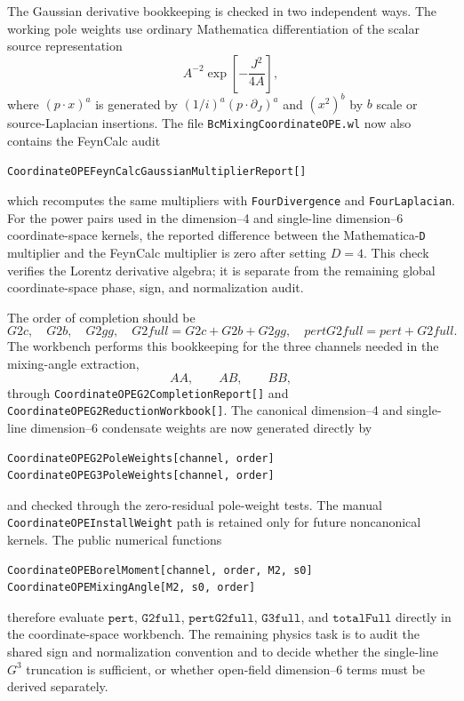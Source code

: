 \documentclass[11pt]{article}
\begin{document}
The Gaussian derivative bookkeeping is checked in two independent ways.  The
working pole weights use ordinary Mathematica differentiation of the scalar
source representation
\[
  A^{-2}\exp\!\left[-\frac{J^2}{4A}\right],
\]
where \((p\cdot x)^a\) is generated by \((1/i)^a(p\cdot\partial_J)^a\) and
\((x^2)^b\) by \(b\) scale or source-Laplacian insertions.  The file
\texttt{BcMixingCoordinateOPE.wl} now also contains the FeynCalc audit
\begin{verbatim}
CoordinateOPEFeynCalcGaussianMultiplierReport[]
\end{verbatim}
which recomputes the same multipliers with
\texttt{FourDivergence} and \texttt{FourLaplacian}.  For the power pairs used
in the dimension--4 and single-line dimension--6 coordinate-space kernels, the
reported difference between the Mathematica-\texttt{D} multiplier and the
FeynCalc multiplier is zero after setting \(D=4\).  This check verifies the
Lorentz derivative algebra; it is separate from the remaining global
coordinate-space phase, sign, and normalization audit.

The order of completion should be
\[
  G2c,\quad G2b,\quad G2gg,\quad
  G2full=G2c+G2b+G2gg,\quad
  pertG2full=pert+G2full .
\]
The workbench performs this bookkeeping for the three channels needed in the
mixing-angle extraction,
\[
  AA,\qquad AB,\qquad BB ,
\]
through \texttt{CoordinateOPEG2CompletionReport[]} and
\texttt{CoordinateOPEG2ReductionWorkbook[]}.  The canonical dimension--4 and
single-line dimension--6 condensate weights are now generated directly by
\begin{verbatim}
CoordinateOPEG2PoleWeights[channel, order]
CoordinateOPEG3PoleWeights[channel, order]
\end{verbatim}
and checked through the zero-residual pole-weight tests.  The manual
\texttt{CoordinateOPEInstallWeight} path is retained only for future
noncanonical kernels.  The public numerical functions
\begin{verbatim}
CoordinateOPEBorelMoment[channel, order, M2, s0]
CoordinateOPEMixingAngle[M2, s0, order]
\end{verbatim}
therefore evaluate \(\texttt{pert}\), \(\texttt{G2full}\),
\(\texttt{pertG2full}\), \(\texttt{G3full}\), and \(\texttt{totalFull}\)
directly in the coordinate-space workbench.  The remaining physics task is to
audit the shared sign and normalization convention and to decide whether the
single-line \(G^3\) truncation is sufficient, or whether open-field
dimension--6 terms must be derived separately.
\end{document}
